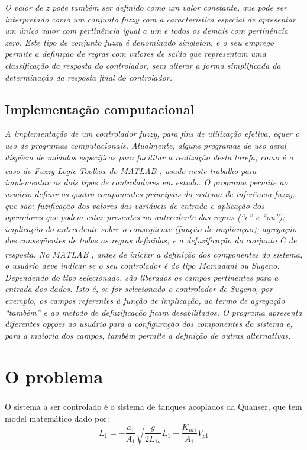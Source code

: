 \documentclass[
	twoside,				%
	twocolumn,				%
	english,				%
	brazil,					%
]{article}
\begin{document}
\textit{O valor de z pode também ser definido como um valor constante, que pode ser interpretado como um conjunto fuzzy com a característica especial de apresentar um único valor com pertinência igual a um e todos os demais com pertinência zero. Este tipo de conjunto fuzzy é denominado singleton, e o seu emprego permite a definição de regras com valores de saída que representam uma classificação da resposta do controlador, sem alterar a forma simplificada da determinação da resposta final do controlador.}

\subsection{Implementação computacional}

\textit{A implementação de um controlador fuzzy, para fins de utilização efetiva,  equer o uso de programas computacionais. Atualmente, alguns programas de uso geral dispõem de módulos específicos para facilitar a realização desta tarefa, como é o caso do Fuzzy Logic Toolbox do MATLAB \textsuperscript{\textregistered}, usado neste trabalho para implementar os dois tipos de controladores em estudo. O programa permite ao usuário definir os quatro componentes principais do sistema de inferência fuzzy, que são: fuzificação dos valores das variáveis de entrada e aplicação dos operadores que podem estar presentes no antecedente das regras (“e” e “ou”); implicação do antecedente sobre o conseqüente (função de implicação); agregação dos conseqüentes de todas as regras definidas; e a defuzificação do conjunto C de resposta. No MATLAB\textsuperscript{\textregistered} , antes de iniciar a definição dos componentes do sistema, o usuário deve indicar se o seu controlador é do tipo Mamadani ou Sugeno. Dependendo do tipo selecionado, são liberados os campos pertinentes para a entrada dos dados. Isto é, se for selecionado o controlador de Sugeno, por exemplo, os campos referentes à função de implicação, ao termo de agregação “também” e ao método de defuzificação ficam desabilitados. O programa apresenta diferentes opções ao usuário para a configuração dos componentes do sistema e, para a maioria dos campos, também permite a definição de outras alternativas. }

\section{O problema}

O sistema a ser controlado é o sistema de tanques acoplados da Quanser\textsuperscript{\textregistered}, que tem model matemático dado por:
\begin{equation}
\label{eq:dL1}
\dot{L_{1}} = - \frac{a_{1}}{A_{1}} \sqrt{\frac{g}{2L_{1o}}}L_{1}+\frac{K_{m1}}{A_{1}}V_{p1}
\end{equation}
\end{document}
